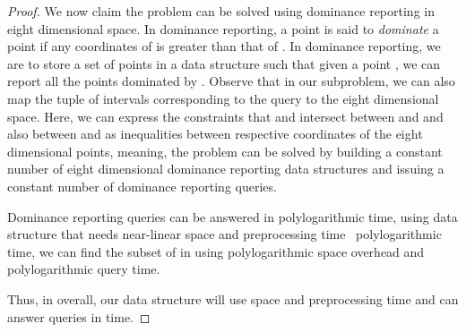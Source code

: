 \begin{proof}
	We now claim the problem can be solved using dominance reporting in eight dimensional space.
	In dominance reporting, a point  is said to \emph{dominate} a point  if
	any coordinates of  is greater than that of . 
	In dominance reporting, we are to store a set of points in a data structure such that given a point ,
	we can report all the points dominated by .
	Observe that in our subproblem, we can also map the tuple of intervals corresponding to the query
	to the eight dimensional space. 
	Here, we can express the constraints that 
	 and  intersect between  and  and also between  and 
	as inequalities between respective coordinates of the eight dimensional points, meaning,
	the problem can be solved by building a constant number of eight dimensional dominance reporting
	data structures and issuing a constant number of dominance reporting queries.
	
    Dominance reporting queries can be answered in polylogarithmic time,  using  data structure that 
	needs near-linear space and preprocessing time~\cite{AAL3,Chan.Kasper.Mihai.orth,Bentley.80,Chazelle.filtering.search,Chazelle.Guibas.fractional.II}
	polylogarithmic time, we can find the subset of  in  using polylogarithmic space overhead and polylogarithmic
    query time.

    Thus, in overall, our data structure will use  space and preprocessing time and can 
	answer queries in  time.
\end{proof}


